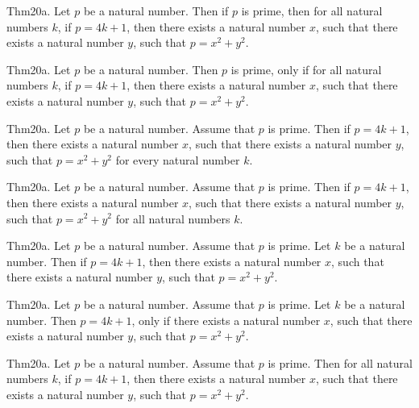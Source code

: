 \documentclass{article}
\begin{document}
Thm20a. Let $p$ be a natural number. Then if $p$ is prime, then for all natural numbers $k$, if $p = 4 k + 1$, then there exists a natural number $x$, such that there exists a natural number $y$, such that $p = x ^{ 2}+ y ^{ 2}$.

Thm20a. Let $p$ be a natural number. Then $p$ is prime, only if for all natural numbers $k$, if $p = 4 k + 1$, then there exists a natural number $x$, such that there exists a natural number $y$, such that $p = x ^{ 2}+ y ^{ 2}$.

Thm20a. Let $p$ be a natural number. Assume that $p$ is prime. Then if $p = 4 k + 1$, then there exists a natural number $x$, such that there exists a natural number $y$, such that $p = x ^{ 2}+ y ^{ 2}$ for every natural number $k$.

Thm20a. Let $p$ be a natural number. Assume that $p$ is prime. Then if $p = 4 k + 1$, then there exists a natural number $x$, such that there exists a natural number $y$, such that $p = x ^{ 2}+ y ^{ 2}$ for all natural numbers $k$.

Thm20a. Let $p$ be a natural number. Assume that $p$ is prime. Let $k$ be a natural number. Then if $p = 4 k + 1$, then there exists a natural number $x$, such that there exists a natural number $y$, such that $p = x ^{ 2}+ y ^{ 2}$.

Thm20a. Let $p$ be a natural number. Assume that $p$ is prime. Let $k$ be a natural number. Then $p = 4 k + 1$, only if there exists a natural number $x$, such that there exists a natural number $y$, such that $p = x ^{ 2}+ y ^{ 2}$.

Thm20a. Let $p$ be a natural number. Assume that $p$ is prime. Then for all natural numbers $k$, if $p = 4 k + 1$, then there exists a natural number $x$, such that there exists a natural number $y$, such that $p = x ^{ 2}+ y ^{ 2}$.
\end{document}

